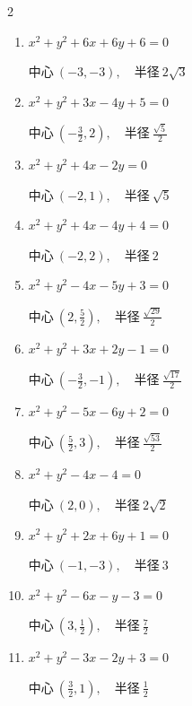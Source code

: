 \begin{multicols}{2}
\begin{enumerate}
  \item $x^{2}+y^{2}+6x+6y+6=0$

        $\displaystyle 中心\: \left(-3,-3\right), \quad 半径 \ 2\sqrt{3}$

  \item $x^{2}+y^{2}+3x-4y+5=0$

        $\displaystyle 中心\: \left(-\frac{3}{2},2\right), \quad 半径 \ \frac{\sqrt{5}}{2}$

\columnbreak %

\resetques

  \item $x^{2}+y^{2}+4x-2y=0$

        $\displaystyle 中心\: \left(-2,1\right), \quad 半径 \ \sqrt{5}$

  \item $x^{2}+y^{2}+4x-4y+4=0$

        $\displaystyle 中心\: \left(-2,2\right), \quad 半径 \ 2$

  \item $x^{2}+y^{2}-4x-5y+3=0$

        $\displaystyle 中心\: \left(2,\frac{5}{2}\right), \quad 半径 \ \frac{\sqrt{29}}{2}$

  \item $x^{2}+y^{2}+3x+2y-1=0$

        $\displaystyle 中心\: \left(-\frac{3}{2},-1\right), \quad 半径 \ \frac{\sqrt{17}}{2}$

  \item $x^{2}+y^{2}-5x-6y+2=0$

        $\displaystyle 中心\: \left(\frac{5}{2},3\right), \quad 半径 \ \frac{\sqrt{53}}{2}$

  \item $x^{2}+y^{2}-4x-4=0$

        $\displaystyle 中心\: \left(2,0\right), \quad 半径 \ 2\sqrt{2}$

  \item $x^{2}+y^{2}+2x+6y+1=0$

        $\displaystyle 中心\: \left(-1,-3\right), \quad 半径 \ 3$

  \item $x^{2}+y^{2}-6x-y-3=0$

        $\displaystyle 中心\: \left(3,\frac{1}{2}\right), \quad 半径 \ \frac{7}{2}$

  \item $x^{2}+y^{2}-3x-2y+3=0$

        $\displaystyle 中心\: \left(\frac{3}{2},1\right), \quad 半径 \ \frac{1}{2}$


\end{enumerate}
\end{multicols}
